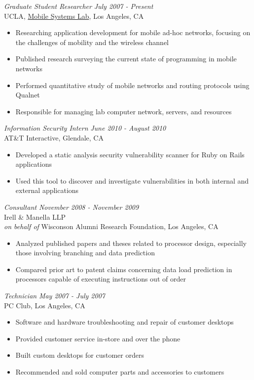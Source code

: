 \documentclass[margin]{res}
\begin{document}
\begin{resume}
{\sl Graduate Student Researcher} \hfill \textit{July 2007 - Present} \\
		UCLA, \href{http://msl.cs.ucla.edu}{Mobile Systems Lab}, Los Angeles, CA
		\begin{itemize}  \itemsep -2pt %
		\item Researching application development for mobile ad-hoc networks, focusing on the challenges of mobility and the wireless channel
		\item Published research surveying the current state of programming in mobile networks
		\item Performed quantitative study of mobile networks and routing protocols using Qualnet
		\item Responsible for managing lab computer network, servers, and resources
		\end{itemize}

{\sl Information Security Intern} \hfill \textit{June 2010 - August 2010} \\
		AT\&T Interactive, Glendale, CA
		\begin{itemize}  \itemsep -2pt %
		\item Developed a static analysis security vulnerability scanner for Ruby on Rails applications
		\item Used this tool to discover and investigate vulnerabilities in both internal and external applications
		\end{itemize}

{\sl Consultant} \hfill \textit{November 2008 - November 2009} \\
		Irell \& Manella LLP \\
		\textit{on behalf of} Wisconson Alumni Research Foundation, Los Angeles, CA
		\begin{itemize}  \itemsep -2pt %
		\item Analyzed published papers and theses related to processor design, especially those involving branching and data prediction
		\item Compared prior art to patent claims concerning data load prediction in processors capable of executing instructions out of order
		\end{itemize}

{\sl Technician} \hfill \textit{May 2007 - July 2007} \\
		PC Club, Los Angeles, CA
		\begin{itemize}  \itemsep -2pt %
		\item Software and hardware troubleshooting and repair of customer desktops
		\item Provided customer service in-store and over the phone
		\item Built custom desktops for customer orders
		\item Recommended and sold computer parts and accessories to customers
		\end{itemize}


\end{resume}
\end{document}
